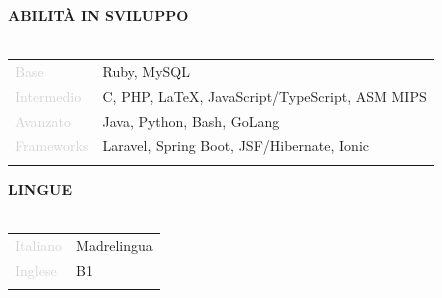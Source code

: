 \documentclass{article}
\begin{document}
\textbf{\textcolor{deepblue}{ABILIT\`A IN SVILUPPO}} \\\\ \hfill
\begin{tabular}{ R{4cm} l }
	\textcolor{lightgray}{Base}       & Ruby, MySQL                                    \\ \hfill
	\textcolor{lightgray}{Intermedio} & C, PHP, LaTeX, JavaScript/TypeScript, ASM MIPS \\ \hfill
	\textcolor{lightgray}{Avanzato}   & Java, Python, Bash, GoLang                     \\[.5cm] \hfill
	\textcolor{lightgray}{Frameworks} & Laravel, Spring Boot, JSF/Hibernate, Ionic     \\ \hfill
\end{tabular}

\textbf{\textcolor{deepblue}{LINGUE}} \\\\ \hfill
\begin{tabular}{ R{4cm} l }
	\textcolor{lightgray}{Italiano} & Madrelingua \\ \hfill
	\textcolor{lightgray}{Inglese}  & B1          \\ \hfill
\end{tabular}
\end{document}
